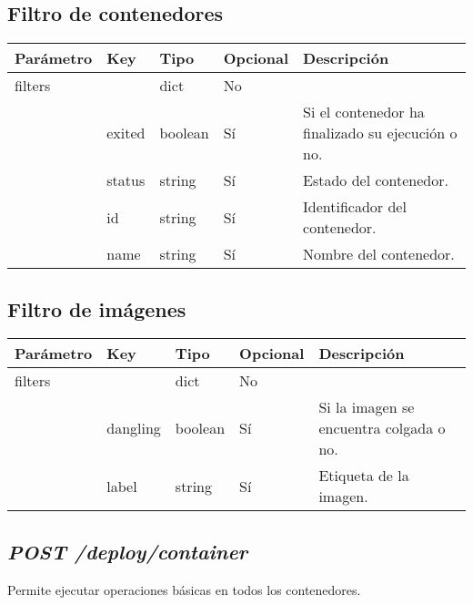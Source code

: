 	\subsection{Filtro de contenedores}
		\begin{table}[h!]
			\centering
	\begin{adjustbox}{max width=\textwidth}
			\begin{tabular}{|l|l|l|l|l|}
				\hline
				Parámetro & Key & Tipo & Opcional & Descripción \\ \hline
				filters &  & dict & No &  \\ \hline
				& exited & boolean & Sí & Si el contenedor ha finalizado su ejecución o no. \\ \hline
				& status & string & Sí & Estado del contenedor. \\ \hline
				& id & string & Sí & Identificador del contenedor. \\ \hline
				& name & string & Sí & Nombre del contenedor. \\ \hline
			\end{tabular}
\end{adjustbox}
		\end{table}
	
	\subsection{Filtro de imágenes}
		\begin{table}[h!]
			\centering
	\begin{adjustbox}{max width=\textwidth}
			\begin{tabular}{|l|l|l|l|l|}
				\hline
				Parámetro & Key & Tipo & Opcional & Descripción \\ \hline
				filters &  & dict & No &  \\ \hline
				& dangling & boolean & Sí & Si la imagen se encuentra colgada o no. \\ \hline
				& label & string & Sí & Etiqueta de la imagen. \\ \hline
			\end{tabular}
\end{adjustbox}
		\end{table}
	
	
	\subsection{\textit{POST /deploy/container}}
		Permite ejecutar operaciones básicas en todos los contenedores.
		
